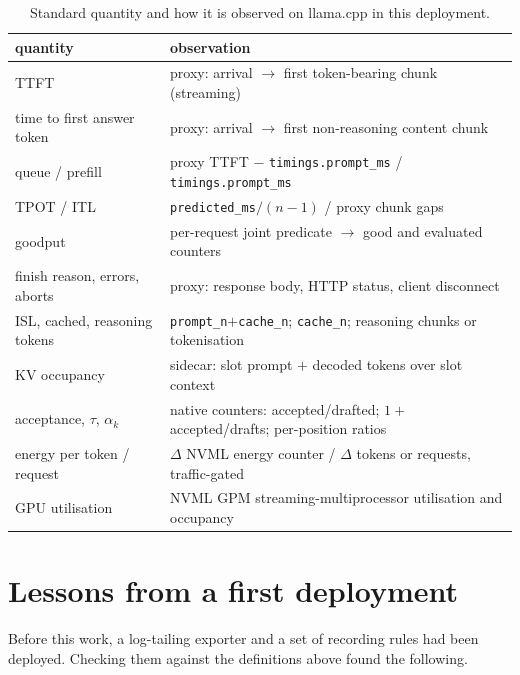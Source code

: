 \documentclass[11pt]{article}
\begin{document}
\begin{table}[t]
\centering\small
\caption{Standard quantity and how it is observed on llama.cpp in this deployment.}
\label{tab:mapping}
\begin{tabularx}{\linewidth}{@{}lY@{}}
\toprule
quantity & observation \\
\midrule
TTFT & proxy: arrival $\to$ first token-bearing chunk (streaming) \\
time to first answer token & proxy: arrival $\to$ first non-reasoning content chunk \\
queue / prefill & proxy TTFT $-$ \texttt{timings.prompt\_ms} / \texttt{timings.prompt\_ms} \\
TPOT / ITL & \texttt{predicted\_ms}$/(n-1)$ / proxy chunk gaps \\
goodput & per-request joint predicate $\to$ good and evaluated counters \\
finish reason, errors, aborts & proxy: response body, HTTP status, client disconnect \\
ISL, cached, reasoning tokens & \texttt{prompt\_n}$+$\texttt{cache\_n}; \texttt{cache\_n}; reasoning chunks or tokenisation \\
KV occupancy & sidecar: slot prompt $+$ decoded tokens over slot context \\
acceptance, $\tau$, $\alpha_k$ & native counters: accepted/drafted; $1+$accepted/drafts; per-position ratios \\
energy per token / request & $\Delta$ NVML energy counter / $\Delta$ tokens or requests, traffic-gated \\
GPU utilisation & NVML GPM streaming-multiprocessor utilisation and occupancy \\
\bottomrule
\end{tabularx}
\end{table}

\section{Lessons from a first deployment}\label{sec:verification}

Before this work, a log-tailing exporter and a set of recording rules had been deployed. Checking them
against the definitions above found the following.
\end{document}
